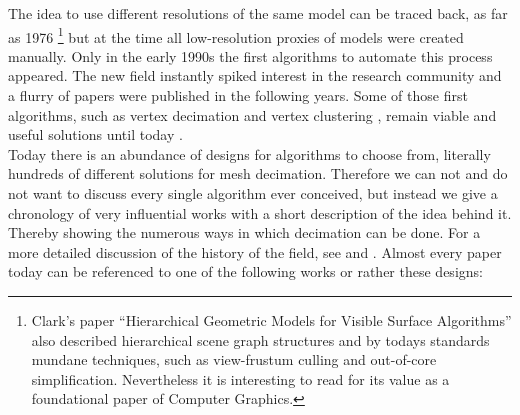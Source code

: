 The idea to use different resolutions of the same model can be traced back, as far as 1976 \citep[cf.][]{Clark1976}\footnote{ Clark's 
paper ``Hierarchical Geometric Models for Visible Surface Algorithms'' also described hierarchical scene graph structures and by todays standards mundane techniques, such as view-frustum culling and out-of-core simplification. Nevertheless it is interesting to read for its value as a foundational paper of Computer Graphics.} but at the time all low-resolution proxies of models were created manually.
Only in the early 1990s the first algorithms to automate this process appeared.
The new field instantly spiked interest in the research community and a flurry of papers were published in the following years.
Some of those first algorithms, such as vertex decimation \citep[][]{Schroeder1992} and vertex clustering \citep[][]{Rossignac1993}, remain viable and useful solutions until today \citep[][cf. pp.7-8]{Luebke2002}.\\
Today there is an abundance of designs for algorithms to choose from, literally hundreds of different solutions for mesh decimation.
Therefore we can not and do not want to discuss every single algorithm ever conceived, but instead we give a chronology of very influential works with a short description of the idea behind it.
Thereby showing the numerous ways in which decimation can be done.
For a more detailed discussion of the history of the field, see \citep[][cf. p.4 ff.]{Diaz-Goano1998} and \citep[][cf. p.8 ff.]{Luebke2002}.
Almost every paper today can be referenced to one of the following works or rather these designs:

